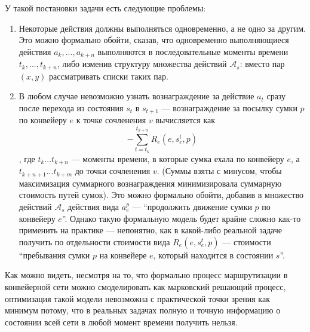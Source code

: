 \documentclass[specification,annotation,times]{itmo-student-thesis}
\theoremstyle{definition}
\begin{document}
У такой постановки задачи есть следующие проблемы:
\begin{enumerate}
\item Некоторые действия должны выполняться одновременно, а не одно за другим.
  Это можно формально обойти, сказав, что одновременно выполняющиеся действия
  $a_k, ... , a_{k+n}$ выполняются в последовательные моменты времени
  $t_k, ... , t_{k+n}$, либо изменив структуру множества действий
  $\mathcal{A}_s$: вместо пар $(x, y)$ рассматривать списки таких пар.
\item В любом случае невозможно узнать вознаграждение за действие $a_t$ сразу
  после перехода из состояния $s_t$ в $s_{t+1}$ --- вознаграждение за посылку
  сумки $p$ по конвейеру $e$ к точке сочленения $v$ вычисляется как
  \[
  - \sum\limits_{t=t_k}^{t_{k+n}} {R_e(e, s_e^t, p)}
  \]
  , где $t_k ... t_{k+n}$ --- моменты времени, в которые сумка ехала по
  конвейеру $e$, а $t_{k+n+1} ... t_{k+m}$ до точки сочленения $v$. (Суммы взяты
  с минусом, чтобы максимизация суммарного вознаграждения минимизировала
  суммарную стоимость путей сумок). Это можно формально обойти, добавив в
  множество действий $\mathcal{A}_s$ действия вида $a_e^p$ ---
  \enquote{продолжить движение сумки $p$ по конвейеру $e$}. Однако такую
  формальную модель будет крайне сложно как-то применить на практике ---
  непонятно, как в какой-либо реальной задаче получить по отдельности стоимости
  вида $R_e(e, s_e^t, p)$ --- стоимости \enquote{пребывания сумки $p$ на конвейере
    $e$, который находится в состоянии $s$}.
\end{enumerate}

Как можно видеть, несмотря на то, что формально процесс маршрутизации в
конвейерной сети можно смоделировать как марковский решающий процесс,
оптимизация такой модели невозможна с практической точки зрения как минимум
потому, что в реальных задачах полную и точную информацию о состоянии всей сети
в любой момент времени получить нельзя.
\end{document}
